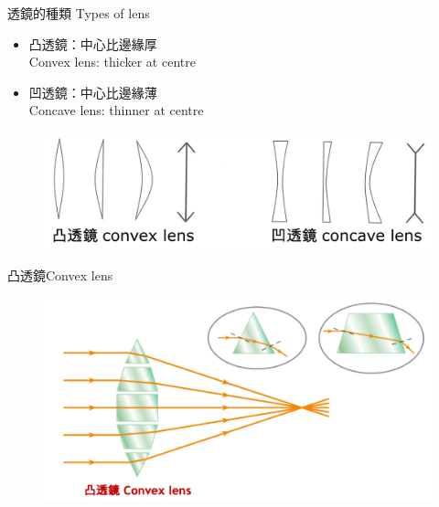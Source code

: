 \documentclass[beamer=true]{standalone}
\begin{document}

\begin{frame}{透鏡的種類 Types of lens}
    \begin{itemize}
        \item 凸透鏡：中心比邊緣厚\\Convex lens: thicker at centre
        \item 凹透鏡：中心比邊緣薄\\Concave lens: thinner at centre
    \end{itemize}\bigskip
    \begin{figure}
        \centering
        \includegraphics[width=1\linewidth]{assets/x1n98exu9198b12ec.png}
    \end{figure}

\end{frame}


\begin{frame}{凸透鏡Convex lens}
    \begin{figure}
        \centering
        \includegraphics[width=1\linewidth]{assets/12d899d8b.png}
    \end{figure}
\end{frame}
\end{document}
